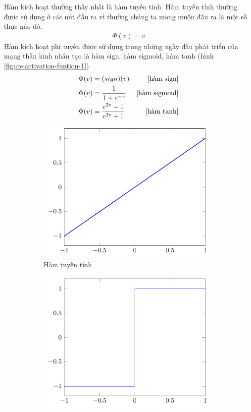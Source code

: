 Hàm kích hoạt thường thấy nhất là hàm tuyến tính. Hàm tuyến tính thường được sử dụng ở các nút đầu ra vì thường chúng ta mong muốn đầu ra là một số thực nào đó.
\begin{align}
    \Phi(v)=v
\end{align}
Hàm kích hoạt phi tuyến được sử dụng trong những ngày đầu phát triển của mạng thần kinh nhân tạo là hàm sign, hàm sigmoid, hàm tanh (hình \ref{figure:activation-funtion-1}).
\begin{align}
    \Phi(v) & =\text(sign)(v)                   & \text{[hàm sign]}    \\
    \Phi(v) & =\dfrac{1}{1+e^{-v}}        & \text{[hàm sigmoid]} \\
    \Phi(v) & =\dfrac{e^{2v}-1}{e^{2v}+1} & \text{[hàm tanh]}
\end{align}
\begin{figure}[htb]
    \centering
    \begin{subfigure}[b]{0.25\textwidth}
        \centering
        \includegraphics[width=\textwidth]{tikz_image/identity.pdf}
        \caption{Hàm tuyến tính}
    \end{subfigure}%
    \begin{subfigure}[b]{0.25\textwidth}
        \centering
        \includegraphics[width=\textwidth]{tikz_image/sign.pdf}

\end{subfigure}
\end{figure}
